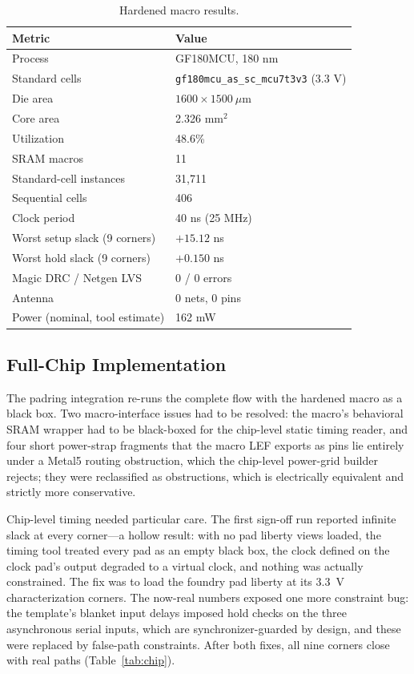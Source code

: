 \documentclass[conference,a4paper]{APSIPA2026}
\begin{document}
\begin{table}[h]
\caption{Hardened macro results.}
\label{tab:signoff}
\centering
\renewcommand{\arraystretch}{1.08}
\begin{tabular}{@{}ll@{}}
\toprule
Metric & Value \\
\midrule
Process & GF180MCU, 180 nm \\
Standard cells & \texttt{gf180mcu\_as\_sc\_mcu7t3v3} (3.3 V) \\
Die area & $1600\times1500~\mu$m \\
Core area & 2.326 mm$^2$ \\
Utilization & 48.6\% \\
SRAM macros & 11 \\
Standard-cell instances & 31,711 \\
Sequential cells & 406 \\
Clock period & 40 ns (25 MHz) \\
Worst setup slack (9 corners) & $+15.12$ ns \\
Worst hold slack (9 corners) & $+0.150$ ns \\
Magic DRC / Netgen LVS & 0 / 0 errors \\
Antenna & 0 nets, 0 pins \\
Power (nominal, tool estimate) & 162 mW \\
\bottomrule
\end{tabular}
\end{table}

\subsection{Full-Chip Implementation}
The padring integration re-runs the complete flow with the hardened macro as a black box. Two macro-interface issues had to be resolved: the macro's behavioral SRAM wrapper had to be black-boxed for the chip-level static timing reader, and four short power-strap fragments that the macro LEF exports as pins lie entirely under a Metal5 routing obstruction, which the chip-level power-grid builder rejects; they were reclassified as obstructions, which is electrically equivalent and strictly more conservative.

Chip-level timing needed particular care. The first sign-off run reported infinite slack at every corner---a hollow result: with no pad liberty views loaded, the timing tool treated every pad as an empty black box, the clock defined on the clock pad's output degraded to a virtual clock, and nothing was actually constrained. The fix was to load the foundry pad liberty at its 3.3~V characterization corners. The now-real numbers exposed one more constraint bug: the template's blanket input delays imposed hold checks on the three asynchronous serial inputs, which are synchronizer-guarded by design, and these were replaced by false-path constraints. After both fixes, all nine corners close with real paths (Table~\ref{tab:chip}).
\end{document}
